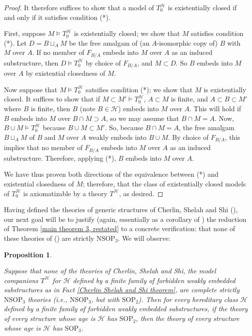 \documentclass{amsart}
\newtheorem{prop}[theorem]{Proposition}
\theoremstyle{definition}
\theoremstyle{remark}
\numberwithin{equation}{section}
\begin{document}
\begin{proof}
It therefore suffices to show that a model of $T^{\mathcal{H}}_{0}$ is existentially closed if and only if it satisfies condition (*).

First, suppose $M \models T^{\mathcal{H}}_{0}$ is existentially closed; we show that $M$ satisfies condition (*). Let $D=B \sqcup_{A} M$ be the free amalgam of (an $A$-isomorphic copy of) $B$ with $M$ over $A$. If no member of $F_{B/A}$ embeds into $M$ over $A$ as an induced substructure, then $D \models T^{\mathcal{H}}_{0}$ by choice of $F_{B/A}$, and $M \subset D$. So $B$ embeds into $M$ over $A$ by existential closedness of $M$.

Now suppose that $M\models T^{\mathcal{H}}_{0}$ satsifies condition (*); we show that $M$ is existentially closed. It suffices to show that if $M \subset M' \models T_{0}^{\mathcal{H}}$, $A \subset M$ is finite, and $A \subset B \subset M'$ where $B$ is finite, then $B$ (note $B \in \mathcal{H}$) embeds into $M$ over $A$. This will hold if $B$ embeds into $M$ over $B \cap M \supset A$, so we may assume that $B\cap M = A$.  Now, $B \cup M \models T_{0}^{\mathcal{H}} $ because $B \cup M \subset M'$. So, because $B \cap M = A$, the free amalgam $B \sqcup_{A} M$ of $B$ and $M$ over $A$ weakly embeds into $B \cup M $. By choice of $F_{B/A}$, this implies that no member of $F_{B/A}$ embeds into $M$ over $A$ as an induced substructure. Therefore, applying (*), $B$ embeds into $M$ over $A$.

We have thus proven both directions of the equivalence between (*) and existential closedness of $M$; therefore, that the class of existentially closed models of $T_{0}^{\mathcal{H}}$ is axiomatizable by a theory $T^{\mathcal{H}}$, as desired.

    
\end{proof}

Having defined the theories of generic structures of Cherlin, Shelah and Shi (\cite{CSS99}), our next goal will be to justify (again, essentially as a corollary of \cite{BBM25}) the reduction of Theorem \ref{main theorem 3, restated} to a concrete verification: that none of these theories of (\cite{CSS99}) are strictly $\mathrm{NSOP}_{3}$. We will observe:

\begin{prop}

\label{reduction to generic structures}

Suppose that none of the theories of Cherlin, Shelah and Shi, the model companions $T^{\mathcal{H}}$ for $\mathcal{H}$ defined by a finite family of forbidden weakly embedded substructures as in Fact \ref{Cherlin Shelah and Shi theorem}, are complete strictly $\mathrm{NSOP}_{3}$ theories (i.e., $\mathrm{NSOP}_{3}$, but with $\mathrm{SOP}_{2}$). Then for every hereditary class $\mathcal{H}$ defined by a finite family of forbidden weakly embedded substructures, if the theory of every structure whose age is $\mathcal{H}$ has $\mathrm{SOP}_{2}$, then the theory of every structure whose age is $\mathcal{H}$ has $\mathrm{SOP}_{3}$.






\end{prop}
\end{document}
